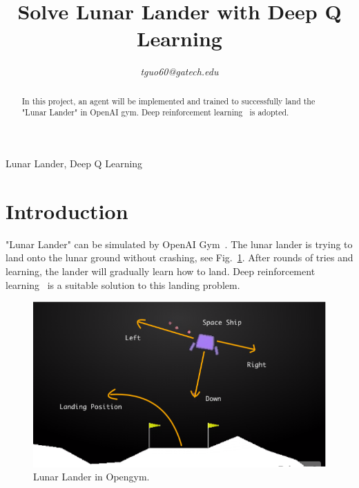 \documentclass[conference]{IEEEtran}
\title{Solve Lunar Lander with Deep Q Learning\\
}
\begin{document}



\author{
\textit{tguo60@gatech.edu}
}

\maketitle

\thispagestyle{firstpage}

\begin{abstract}
In this project, an agent will be implemented and trained to successfully land the "Lunar Lander" in OpenAI gym. Deep reinforcement learning~\cite{b1} is adopted.
\end{abstract}

\begin{IEEEkeywords}
Lunar Lander, Deep Q Learning
\end{IEEEkeywords}

\section{Introduction}

"Lunar Lander" can be simulated by OpenAI Gym~\cite{b2}. The lunar lander is trying to land onto the lunar ground without crashing, see Fig.~\ref{fig1}. After rounds of tries and learning, the lander will gradually learn how to land. Deep reinforcement learning~\cite{b1} is a suitable solution to this landing problem.

\begin{figure}[htbp]
\includegraphics[width=\linewidth]{lander.png}
\caption{Lunar Lander in Opengym.}
\label{fig1}
\end{figure}
\end{document}
